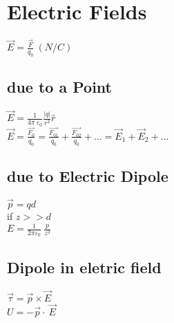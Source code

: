 \section{Electric Fields}
$\vec{E}=\frac{\vec{F}}{q_0}\:\left(N/C \right)$\\
\subsection{due to a Point}
$\vec{E}=\frac{1}{4\pi \:\varepsilon_0}\frac{\left|q\right|}{r^2}\widehat{r}$\\
$\vec{E}=\frac{\vec{F_0}}{q_0}=\frac{\vec{F_{01}}}{q_0}+\frac{\vec{F_{02}}}{q_0}+\dots =\vec{E}_1+\vec{E}_2+\dots $\\
\subsection{due to Electric Dipole}
$\vec{p}=qd$\\
if $z>>d$\\
$E=\frac{1}{2\pi \varepsilon_0}\:\frac{p}{z^3}$\\
\subsection{Dipole in eletric field}
$\vec{\tau }=\vec{p}\times \vec{E}$\\
$U=-\vec{p}\cdot \:\vec{E}$\\